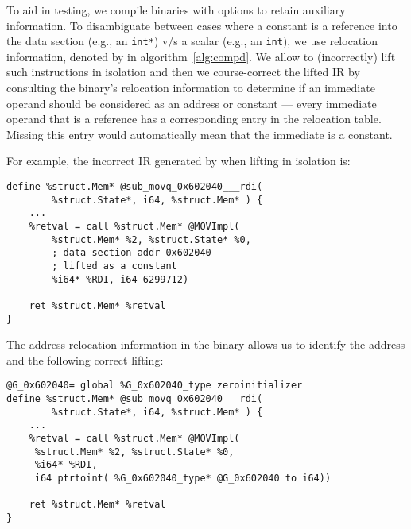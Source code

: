 
To aid in testing, we compile binaries with options to retain auxiliary
information. To disambiguate between cases where a constant is a reference
into the data section (e.g., an \texttt{int*}) v/s a scalar (e.g., an
\texttt{int}), we use relocation information, denoted by  in
algorithm~\ref{alg:compd}.  We allow \mcsema to (incorrectly) lift such
instructions in isolation and then we course-correct the lifted IR by
consulting the binary's relocation information to determine if an immediate
operand should be considered as an address or constant --- every immediate
operand that is a reference has a corresponding entry in the relocation table.
Missing this entry would automatically mean that the immediate is a constant.

For example, the incorrect IR generated by \mcsema when lifting  in isolation is:
\begin{lstlisting}[style=LLVM]
define %struct.Mem* @sub_movq_0x602040___rdi(
        %struct.State*, i64, %struct.Mem* ) {
    ...
    %retval = call %struct.Mem* @MOVImpl(
        %struct.Mem* %2, %struct.State* %0,
        ; data-section addr 0x602040
        ; lifted as a constant
        %i64* %RDI, i64 6299712)

    ret %struct.Mem* %retval
}
\end{lstlisting}

The address relocation information in the binary allows us to identify the address
and the following correct lifting:
\begin{lstlisting}[style=LLVM]
%G_0x602040_type = type <{ [8 x i8] }>
@G_0x602040= global %G_0x602040_type zeroinitializer
define %struct.Mem* @sub_movq_0x602040___rdi(
        %struct.State*, i64, %struct.Mem* ) {
    ...
    %retval = call %struct.Mem* @MOVImpl(
     %struct.Mem* %2, %struct.State* %0,
     %i64* %RDI,
     i64 ptrtoint( %G_0x602040_type* @G_0x602040 to i64))

    ret %struct.Mem* %retval
}
\end{lstlisting}

